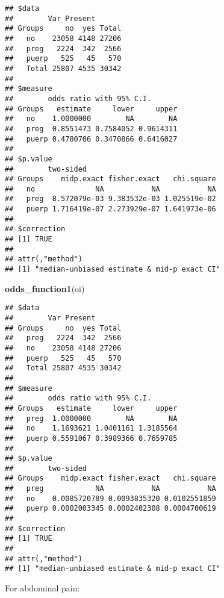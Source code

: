 \documentclass[
]{article}
\newenvironment{Shaded}{\begin{snugshade}}{\end{snugshade}}
\newcommand{\DataTypeTok}[1]{\textcolor[rgb]{0.13,0.29,0.53}{#1}}
\newcommand{\KeywordTok}[1]{\textcolor[rgb]{0.13,0.29,0.53}{\textbf{#1}}}
\newcommand{\NormalTok}[1]{#1}
\newcommand{\OperatorTok}[1]{\textcolor[rgb]{0.81,0.36,0.00}{\textbf{#1}}}
\newcommand{\OtherTok}[1]{\textcolor[rgb]{0.56,0.35,0.01}{#1}}
\newcommand{\StringTok}[1]{\textcolor[rgb]{0.31,0.60,0.02}{#1}}
\begin{document}
\begin{verbatim}
## $data
##        Var Present
## Groups     no  yes Total
##   no    23058 4148 27206
##   preg   2224  342  2566
##   puerp   525   45   570
##   Total 25807 4535 30342
## 
## $measure
##        odds ratio with 95% C.I.
## Groups   estimate     lower     upper
##   no    1.0000000        NA        NA
##   preg  0.8551473 0.7584052 0.9614311
##   puerp 0.4780706 0.3470866 0.6416027
## 
## $p.value
##        two-sided
## Groups    midp.exact fisher.exact   chi.square
##   no              NA           NA           NA
##   preg  8.572079e-03 9.383532e-03 1.025519e-02
##   puerp 1.716419e-07 2.273929e-07 1.641973e-06
## 
## $correction
## [1] TRUE
## 
## attr(,"method")
## [1] "median-unbiased estimate & mid-p exact CI"
\end{verbatim}

\begin{Shaded}
\begin{Highlighting}[]
\KeywordTok{odds_function1}\NormalTok{(oi)}
\end{Highlighting}
\end{Shaded}

\begin{verbatim}
## $data
##        Var Present
## Groups     no  yes Total
##   preg   2224  342  2566
##   no    23058 4148 27206
##   puerp   525   45   570
##   Total 25807 4535 30342
## 
## $measure
##        odds ratio with 95% C.I.
## Groups   estimate     lower     upper
##   preg  1.0000000        NA        NA
##   no    1.1693621 1.0401161 1.3185564
##   puerp 0.5591067 0.3989366 0.7659785
## 
## $p.value
##        two-sided
## Groups    midp.exact fisher.exact   chi.square
##   preg            NA           NA           NA
##   no    0.0085720789 0.0093835320 0.0102551859
##   puerp 0.0002003345 0.0002402308 0.0004700619
## 
## $correction
## [1] TRUE
## 
## attr(,"method")
## [1] "median-unbiased estimate & mid-p exact CI"
\end{verbatim}

For abdominal pain:

\begin{Shaded}
\end{Shaded}
\end{document}
